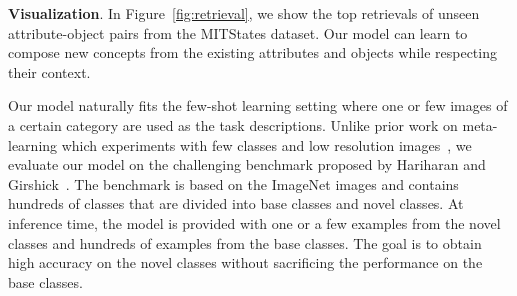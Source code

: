 \documentclass[10pt,twocolumn,letterpaper]{article}
\newcommand\minisection[1]{\vspace{2mm}\noindent \textbf{#1}}
\begin{document}
\begin{figure*}[t!]
    \centering
    \small
    \caption{Top retrievals on the unseen pairs of the MITStates dataset. Our model can learn to compose new concepts from the existing attributes and objects
    while respecting their context. The second row shows some of the failure cases.}
    \label{fig:retrieval}
\end{figure*}\minisection{Visualization}. 
In Figure~\ref{fig:retrieval}, we show the top
retrievals of unseen attribute-object pairs from the MITStates dataset. 
Our model can learn to compose new concepts from the existing attributes and objects
while respecting their context.

Our model naturally fits the few-shot learning setting where one or few images
of a certain category are used as the task descriptions. Unlike prior work on meta-learning 
which experiments with few classes and low resolution images~\cite{vinyals2016matching, snell2017prototypical,finn2017model}, we evaluate
our model on the challenging benchmark proposed by Hariharan and Girshick~\cite{hariharan2017low}. The benchmark is based on the ImageNet images and
contains hundreds of classes that are divided into base classes and novel classes.
At inference time, the model is provided with one or a few examples from the novel classes
and hundreds of examples from the base classes. 
The goal is to obtain high accuracy 
on the novel classes without sacrificing the performance on the base classes. 
\end{document}
